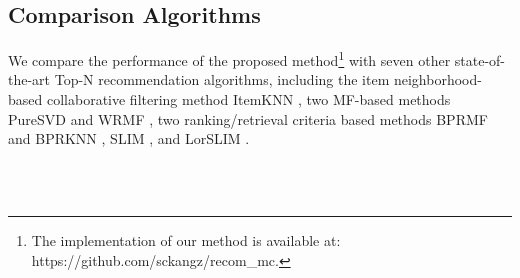 \documentclass[letterpaper]{article}
\begin{document}
\subsection{Comparison Algorithms}
We compare the performance of the proposed method\footnote{The implementation of our method is available at: https://github.com/sckangz/recom\_mc.} with seven other state-of-the-art Top-N recommendation algorithms, including the item neighborhood-based collaborative filtering method ItemKNN \cite{deshpande2004item}, two MF-based methods PureSVD \cite{cremonesi2010performance} and WRMF \cite{hu2008collaborative}, two ranking/retrieval criteria based methods BPRMF and BPRKNN \cite{rendle2009bpr}, SLIM \cite{ning2011slim}, and LorSLIM \cite{cheng2014lorslim}.
\begin{figure}[!ht]
\centering
{}
\\
\\

\end{figure}
\end{document}
